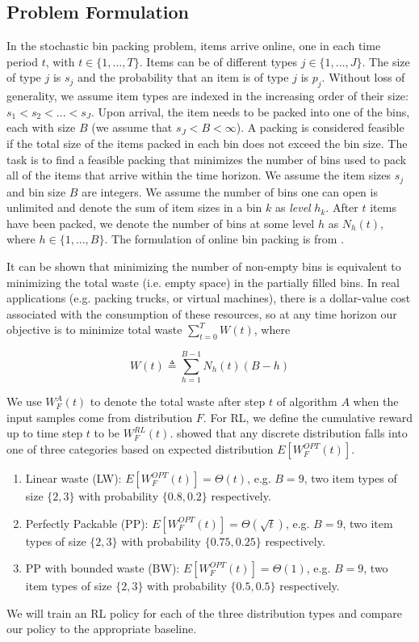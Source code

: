 \subsection{Problem Formulation} \label{sec: bin_packing_prob_form}
In the stochastic bin packing problem, items arrive online, one in each time period $t$, with $t \in \{1, \ldots, T\}$. Items can be of different types $j \in \{1,...,J\}$. The size of type $j$ is $s_j$ and the probability that an item is of type $j$ is $p_j$. Without loss of generality, we assume item types are indexed in the increasing order of their size: $s_1 < s_2 < ... < s_J$. Upon arrival, the item needs to be packed into one of the bins, each with size $B$ (we assume that $s_J < B < \infty$). A packing is considered feasible if the total size of the items packed in each bin does not exceed the bin size. The task is to find a feasible packing that minimizes the number of bins used to pack all of the items that arrive within the time horizon. We assume the item sizes $s_j$ and bin size $B$ are integers. We assume the number of bins one can open is unlimited and denote the sum of item sizes in a bin $k$ as \emph{level} $h_{k}$. After $t$ items have been packed, we denote the number of bins at some level $h$ as $N_h(t)$, where $h \in \{1,...,B\}$. The formulation of online bin packing is from \cite{gupta2012online}. 

It can be shown that minimizing the number of non-empty bins is equivalent to minimizing the total waste (i.e. empty space) in the partially filled bins.  In real applications (e.g. packing trucks, or virtual machines), there is a dollar-value cost associated with the consumption of these resources, so at any time horizon our objective is to minimize total waste $\sum_{t=0}^{T} W(t)$, where

\begin{equation}
\label{waste}
W(t) \triangleq \sum_{h=1}^{B-1} N_h(t)(B-h) 
\end{equation}

\noindent We use $W^{A}_{F}(t)$ to denote the total waste after step $t$ of algorithm $A$ when the input samples come from distribution $F$. For RL, we define the cumulative reward up to time step $t$ to be $W^{RL}_{F}(t)$. \cite{courcobetis1990stability} showed that any discrete distribution falls into one of three categories based on expected distribution $E[W^{OPT}_{F}(t)]$.
\begin{enumerate}[topsep=0pt,itemsep=-1ex,partopsep=1ex,parsep=1ex]
	\item Linear waste (LW): $E[W^{OPT}_{F}(t)] = \Theta(t)$, e.g. $B = 9$, two item types of size $\{2,3\}$ with probability $\{0.8, 0.2\}$ respectively.
	\item Perfectly Packable (PP):  $E[W^{OPT}_{F}(t)] = \Theta(\sqrt{t})$, e.g.  $B = 9$, two item types of size $\{2,3\}$ with probability $\{0.75, 0.25\}$ respectively.
	\item PP with bounded waste (BW): $E[W^{OPT}_{F}(t)] = \Theta(1)$, e.g. $B = 9$, two item types of size $\{2,3\}$ with probability $\{0.5, 0.5\}$ respectively.
\end{enumerate}
We will train an RL policy for each of the three distribution types and compare our policy to the appropriate baseline.


